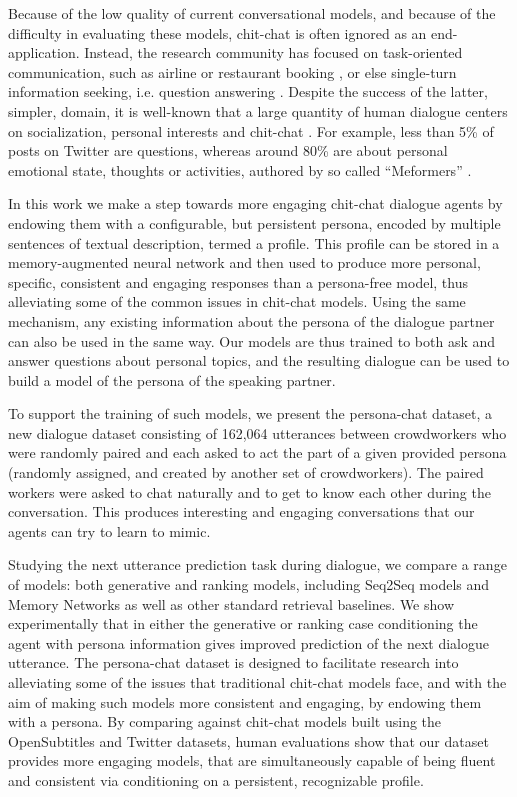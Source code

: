\documentclass[11pt,a4paper]{article}
\begin{document}
Because of the low quality of current conversational models, and because of the difficulty in evaluating these models, chit-chat
is often ignored as an end-application.  Instead, the research community has focused on 
 task-oriented communication,
 such as airline or restaurant booking \citep{bordes2016learning}, or else single-turn information seeking, i.e. question answering \cite{rajpurkar2016squad}. 
Despite the success of the latter, simpler, domain,
it is well-known that a large quantity of human dialogue centers on socialization, personal interests and chit-chat \citep{dunbar1997human}. For example, less than 5\% of posts on Twitter are questions, whereas around 80\% are about personal emotional state, thoughts or activities, authored by so called ``Meformers'' \citep{naaman2010really}.

In this work we make a step towards more engaging chit-chat dialogue agents by endowing them with a configurable, but persistent persona, encoded by multiple sentences of textual description, termed a profile. This profile can be stored in a memory-augmented neural network and then used to produce more personal, specific, consistent and engaging responses than a persona-free model, thus alleviating some of the common issues in chit-chat models.
Using the same mechanism, any existing information about the persona of the dialogue partner can also be used in the same way. Our models are thus trained to both ask and answer questions about personal topics, and the resulting dialogue can be used to build a model of the persona of the speaking partner.


To support the training of such models, we present the {\sc persona-chat} dataset, a new dialogue dataset consisting of 162,064 utterances 
between crowdworkers who were randomly paired and each asked to act the part of a given provided persona (randomly assigned, and created by another set of crowdworkers). The paired workers were asked to chat naturally and to get to know each other during the conversation. This produces interesting and engaging conversations that our agents can try to learn to mimic. 





Studying the next utterance prediction task during dialogue, we compare a range of models: both generative and ranking models, including Seq2Seq models and Memory Networks \citep{memn2n} as well as other standard retrieval baselines. 
We show experimentally that in either the generative or ranking case 
conditioning the agent with persona information  
gives improved prediction of the next dialogue utterance.  
The {\sc persona-chat} dataset is designed to facilitate research into alleviating some of the issues that traditional chit-chat models face, and with the aim of making such models more consistent and engaging, by endowing them with a persona.
By comparing against chit-chat models built using the OpenSubtitles and Twitter datasets,
human evaluations show that our dataset provides more engaging models,
that are simultaneously capable of being fluent and consistent via conditioning on a persistent, recognizable profile.
\end{document}
